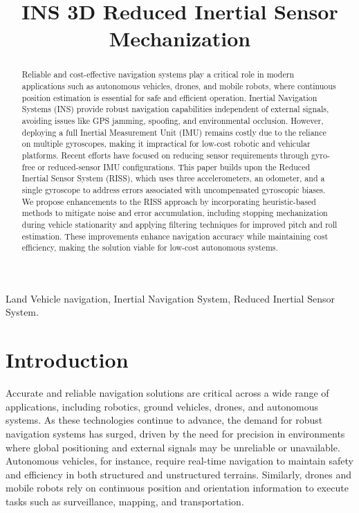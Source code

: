 \documentclass[conference]{IEEEtran}
\begin{document}
\title{INS 3D Reduced Inertial Sensor Mechanization}

\author{
}

\maketitle

\begin{abstract}
Reliable and cost-effective navigation systems play a critical role in modern applications such as autonomous vehicles, drones, and mobile robots, where continuous position estimation is essential for safe and efficient operation. Inertial Navigation Systems (INS) provide robust navigation capabilities independent of external signals, avoiding issues like GPS jamming, spoofing, and environmental occlusion. However, deploying a full Inertial Measurement Unit (IMU) remains costly due to the reliance on multiple gyroscopes, making it impractical for low-cost robotic and vehicular platforms. Recent efforts have focused on reducing sensor requirements through gyro-free or reduced-sensor IMU configurations. This paper builds upon the Reduced Inertial Sensor System (RISS), which uses three accelerometers, an odometer, and a single gyroscope to address errors associated with uncompensated gyroscopic biases. We propose enhancements to the RISS approach by incorporating heuristic-based methods to mitigate noise and error accumulation, including stopping mechanization during vehicle stationarity and applying filtering techniques for improved pitch and roll estimation. These improvements enhance navigation accuracy while maintaining cost efficiency, making the solution viable for low-cost autonomous systems.
\end{abstract}

\begin{IEEEkeywords}
Land Vehicle navigation, Inertial Navigation System, Reduced Inertial Sensor System.
\end{IEEEkeywords}

\section{Introduction}
Accurate and reliable navigation solutions are critical across a wide range of applications, including robotics, ground vehicles, drones, and autonomous systems. As these technologies continue to advance, the demand for robust navigation systems has surged, driven by the need for precision in environments where global positioning and external signals may be unreliable or unavailable. Autonomous vehicles, for instance, require real-time navigation to maintain safety and efficiency in both structured and unstructured terrains. Similarly, drones and mobile robots rely on continuous position and orientation information to execute tasks such as surveillance, mapping, and transportation.
\end{document}
